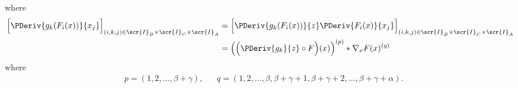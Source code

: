 \documentclass[11pt]{article}
\newcommand{\tprod}[2]{\,\,^{#1}\!\!*^{#2}}
\theoremstyle{remark}
\begin{document}
where
\begin{align*}
  \Big[\PDeriv{g_k(F_i(x))}{x_j}\Big]_{(i,k,j)\in\scr{I}_B\times\scr{I}_C\times\scr{I}_A}
  &= \Big[\PDeriv{g_k(F_i(x))}{z}\PDeriv{F_i(x)}{x_j}\Big]_{(i,k,j)\in\scr{I}_B\times\scr{I}_C\times\scr{I}_A}\\
  &= \Big(\Big(\PDeriv{g_k}{z} \circ F\Big)(x)\Big)^{(p)} * \nabla_x F(x)^{(q)} 
\end{align*}
where
\begin{align*}
  &p=(1,2,\dots,\beta+\gamma), &
  &q=(1,2,\dots,\beta,\beta+\gamma+1,\beta+\gamma+2,\dots,\beta+\gamma+\alpha).
\end{align*}

\end{document}
